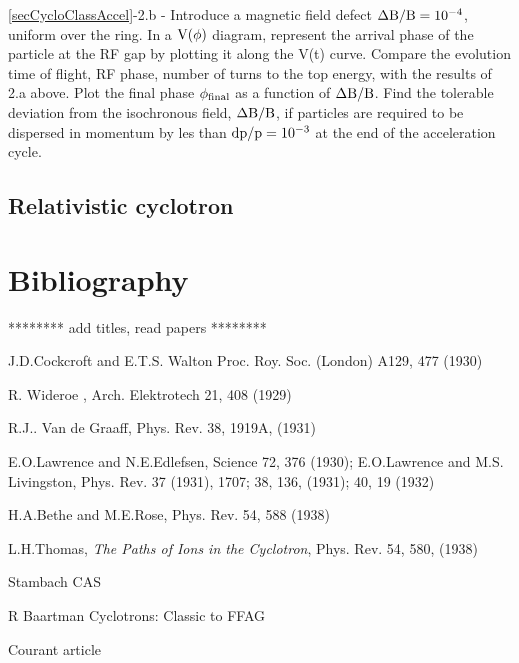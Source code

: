 \noindent \ref{secCycloClassAccel}-2.b - 
Introduce a magnetic field defect $\rm \Delta B/B= 10^{-4}$, uniform over the ring. 
In a $\rm V(\phi)$ diagram, represent  the arrival phase  of the particle at the RF gap
by plotting it along the V(t) curve. 
Compare the evolution time of flight, RF phase, number of turns to the top energy,
 with the results of 2.a above.
 Plot the final phase $\rm \phi_{\rm final}$ as a function of $\rm \Delta B/B$. 
 Find the tolerable deviation from the isochronous field, 
$\rm \Delta B/B$,  if particles are required to be dispersed in momentum by les 
than $\rm dp/p=10^{-3}$ at the end of the acceleration cycle.




\subsection{Relativistic cyclotron}




\section{Bibliography \label{SecBiblioCyclotron}}

******** add titles, read papers ********

J.D.Cockcroft and E.T.S. Walton Proc. Roy. Soc. (London) A129, 477 (1930)

R. Wideroe , Arch. Elektrotech 21, 408 (1929)

R.J.. Van de Graaff, Phys. Rev. 38, 1919A, (1931)

E.O.Lawrence and N.E.Edlefsen, Science 72, 376 (1930); 
E.O.Lawrence and M.S. Livingston, Phys. Rev. 37 (1931), 1707; 38, 136, (1931); 40, 19 (1932)

H.A.Bethe and M.E.Rose, Phys. Rev. 54, 588 (1938)

L.H.Thomas,  \textsl{The Paths of Ions in the Cyclotron}, Phys. Rev. 54, 580, (1938)

Stambach CAS

R Baartman Cyclotrons: Classic to FFAG

 Courant article
